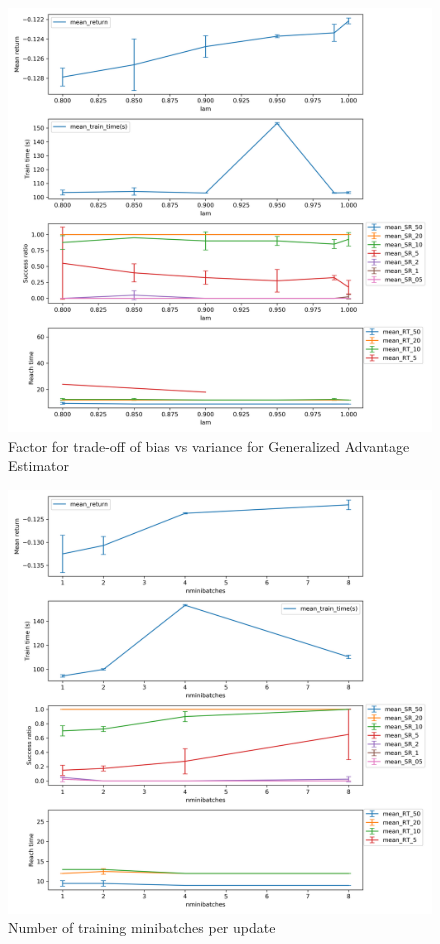 \documentclass{article}
\begin{document}
\begin{figure}[H]
    \centering
    \includegraphics[width=\textwidth]{../ppo2_lam.png}
\caption{Factor for trade-off of bias vs variance for Generalized Advantage Estimator}
\end{figure}

\begin{figure}[H]
    \centering
    \includegraphics[width=\textwidth]{../ppo2_nminibatches.png}
\caption{Number of training minibatches per update}
\end{figure}
\end{document}

